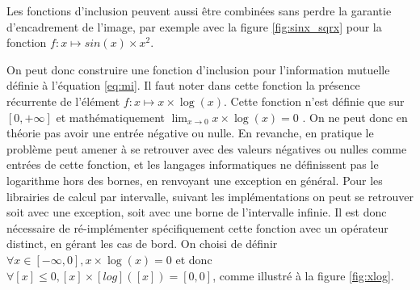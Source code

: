 \documentclass[12pt,a4paper]{article}
\begin{document}
    Les fonctions d'inclusion peuvent aussi être combinées sans perdre la garantie d'encadrement de l'image, par exemple avec la figure \ref{fig:sinx_sqrx} pour la fonction $f : x \mapsto sin(x) \times x^2$.

    On peut donc construire une fonction d'inclusion pour l'information mutuelle définie à l'équation \ref{eq:mi}. Il faut noter dans cette fonction la présence récurrente de l'élément $f : x \mapsto x \times \log(x)$. Cette fonction n'est définie que sur $[0, +\infty]$ et mathématiquement $\displaystyle \lim_{x \to 0} x\times\log(x) = 0$ . On ne peut donc en théorie pas avoir une entrée négative ou nulle. En revanche, en pratique le problème peut amener à se retrouver avec des valeurs négatives ou nulles comme entrées de cette fonction, et les langages informatiques ne définissent pas le logarithme hors des bornes, en renvoyant une exception en général. Pour les librairies de calcul par intervalle, suivant les implémentations on peut se retrouver soit avec une exception, soit avec une borne de l'intervalle infinie. Il est donc nécessaire de ré-implémenter spécifiquement cette fonction avec un opérateur distinct, en gérant les cas de bord. On choisi de définir $ \forall x \in [-\infty, 0], x \times \log(x) = 0$ et donc $\forall [x] \leq 0 , [x]\times[log]([x]) = [0, 0]$, comme illustré à la figure \ref{fig:xlog}.
\end{document}
